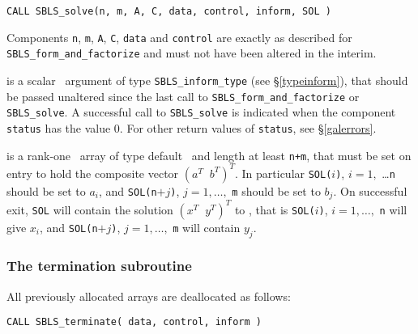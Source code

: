 \documentclass{galahad}
\newcommand{\packagename}{SBLS}
\begin{document}
\hspace{8mm}
{\tt CALL \packagename\_solve(n, m, A, C, data, control, inform, SOL )}
\vspace*{1mm}

\noindent
Components {\tt n}, {\tt m},  {\tt A}, {\tt C}, {\tt data} and
{\tt control} are exactly as described for
{\tt \packagename\_form\_and\_factorize} and must not have been
altered in the interim.

\vspace*{-3mm}
\begin{description}

 is a scalar \intentout\ argument of type
{\tt \packagename\_inform\_type}
(see \S\ref{typeinform}), that should be passed unaltered since
the last call to {\tt \packagename\_form\_and\_factorize} or
{\tt \packagename\_solve}.  A successful call to
{\tt \packagename\_solve}
is indicated when the  component {\tt status} has the value 0.
For other return values of {\tt status}, see \S\ref{galerrors}.

 is a rank-one  \intentinout\ array of type default \real\
and length at least {\tt n+m}, that must be set on entry to hold
the composite vector $( a^T \;\; b^T)^T$.
In particular {\tt SOL(}$i${\tt )}, $i = 1,$ \ldots {\tt n} should be
set to $a_i$, and
{\tt SOL(n}$+j${\tt )}, $j = 1, \ldots,$ {\tt m} should be
set to $b_j$. On successful exit, {\tt SOL}
will contain the solution $( x^T \;\; y^T)^T$ to , that is
{\tt SOL(}$i${\tt )}, $i = 1, \ldots,$ {\tt n} will give
$x_i$, and  {\tt SOL(n}$+j${\tt )}, $j = 1,\ldots,$ {\tt m} will contain
$y_j$.



\end{description}


\subsubsection{The  termination subroutine}
All previously allocated arrays are deallocated as follows:
\vspace*{1mm}

\hspace{8mm}
{\tt CALL \packagename\_terminate( data, control, inform )}
\end{document}
